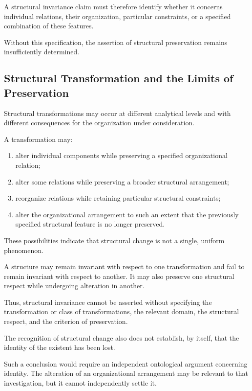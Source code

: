 A structural invariance claim must therefore
identify whether it concerns individual
relations, their organization, particular
constraints, or a specified combination
of these features.

Without this specification, the assertion
of structural preservation remains
insufficiently determined.

\subsection{Structural Transformation and the Limits of Preservation}

Structural transformations may occur at
different analytical levels and with
different consequences for the organization
under consideration.

A transformation may:

\begin{enumerate}
    \item alter individual components while
          preserving a specified organizational
          relation;

    \item alter some relations while preserving
          a broader structural arrangement;

    \item reorganize relations while retaining
          particular structural constraints;

    \item alter the organizational arrangement
          to such an extent that the previously
          specified structural feature is no
          longer preserved.
\end{enumerate}

These possibilities indicate that structural
change is not a single, uniform phenomenon.

A structure may remain invariant with respect
to one transformation and fail to remain
invariant with respect to another. It may
also preserve one structural respect while
undergoing alteration in another.

Thus, structural invariance cannot be asserted
without specifying the transformation or
class of transformations, the relevant domain,
the structural respect, and the criterion
of preservation.

The recognition of structural change also
does not establish, by itself, that the
identity of the existent has been lost.

Such a conclusion would require an independent
ontological argument concerning identity.
The alteration of an organizational arrangement
may be relevant to that investigation, but
it cannot independently settle it.

